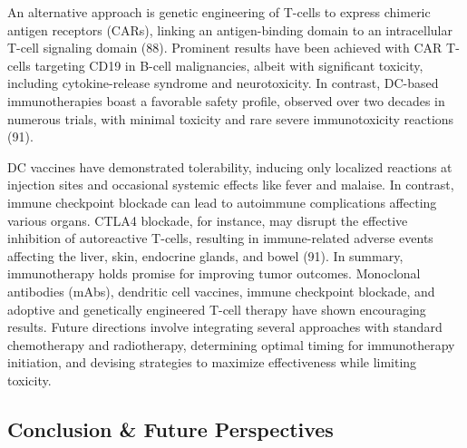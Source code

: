 \documentclass[
]{article}
\begin{document}
An alternative approach is genetic engineering of T-cells to express
chimeric antigen receptors (CARs), linking an antigen-binding domain to
an intracellular T-cell signaling domain (88). Prominent results have
been achieved with CAR T-cells targeting CD19 in B-cell malignancies,
albeit with significant toxicity, including cytokine-release syndrome
and neurotoxicity. In contrast, DC-based immunotherapies boast a
favorable safety profile, observed over two decades in numerous trials,
with minimal toxicity and rare severe immunotoxicity reactions (91).

DC vaccines have demonstrated tolerability, inducing only localized
reactions at injection sites and occasional systemic effects like fever
and malaise. In contrast, immune checkpoint blockade can lead to
autoimmune complications affecting various organs. CTLA4 blockade, for
instance, may disrupt the effective inhibition of autoreactive T-cells,
resulting in immune-related adverse events affecting the liver, skin,
endocrine glands, and bowel (91). In summary, immunotherapy holds
promise for improving tumor outcomes. Monoclonal antibodies (mAbs),
dendritic cell vaccines, immune checkpoint blockade, and adoptive and
genetically engineered T-cell therapy have shown encouraging results.
Future directions involve integrating several approaches with standard
chemotherapy and radiotherapy, determining optimal timing for
immunotherapy initiation, and devising strategies to maximize
effectiveness while limiting toxicity.

\subsection{Conclusion \& Future
Perspectives}\label{conclusion-future-perspectives}
\end{document}
